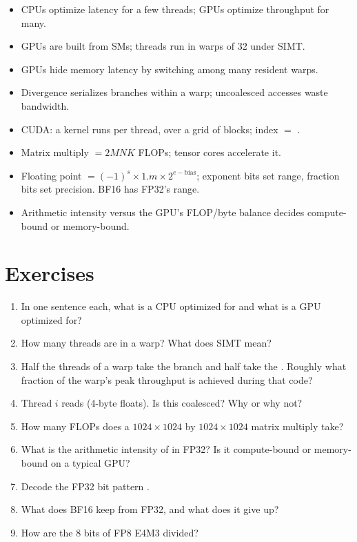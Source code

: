 \begin{itemize}
  \item CPUs optimize latency for a few threads; GPUs optimize throughput for many.
  \item GPUs are built from SMs; threads run in warps of 32 under SIMT.
  \item GPUs hide memory latency by switching among many resident warps.
  \item Divergence serializes branches within a warp; uncoalesced accesses waste bandwidth.
  \item CUDA: a kernel runs per thread, over a grid of blocks; index $=$ .
  \item Matrix multiply $= 2MNK$ FLOPs; tensor cores accelerate it.
  \item Floating point $= (-1)^s \times 1.m \times 2^{e-\text{bias}}$; exponent bits set range, fraction bits set precision. BF16 has FP32's range.
  \item Arithmetic intensity versus the GPU's FLOP/byte balance decides compute-bound or memory-bound.
\end{itemize}

\section{Exercises}

\begin{enumerate}
  \item In one sentence each, what is a CPU optimized for and what is a GPU optimized for?
  \item How many threads are in a warp? What does SIMT mean?
  \item Half the threads of a warp take the  branch and half take the . Roughly what fraction of the warp's peak throughput is achieved during that code?
  \item Thread $i$ reads  (4-byte floats). Is this coalesced? Why or why not?
  \item How many FLOPs does a $1024 \times 1024$ by $1024 \times 1024$ matrix multiply take?
  \item What is the arithmetic intensity of  in FP32? Is it compute-bound or memory-bound on a typical GPU?
  \item Decode the FP32 bit pattern .
  \item What does BF16 keep from FP32, and what does it give up?
  \item How are the 8 bits of FP8 E4M3 divided?
\end{enumerate}

